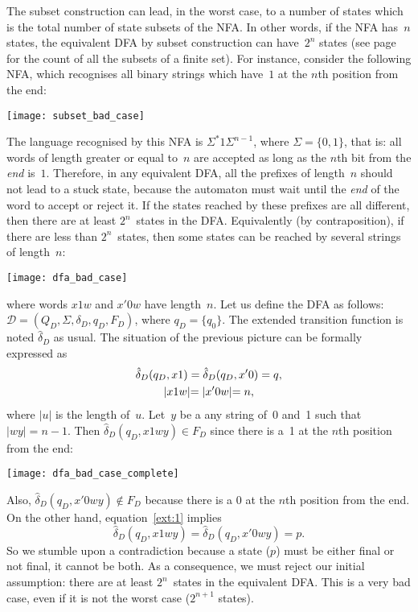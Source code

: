 The subset construction can lead, in the worst case, to a number of
states which is the total number of state subsets of the NFA. In other
words, if the NFA has~\(n\) states, the equivalent DFA by subset
construction can have~\(2^n\) states (see
page~\pageref{state_explosion} for the count of all the subsets of a
finite set). For instance, consider the following NFA, which
recognises all binary strings which have~\(1\) at the \(n\)th
position from the end:
\begin{center}
\texttt{[image: subset\_bad\_case]}
\end{center}
The language recognised by this NFA is \(\Sigma^{*} 1 \Sigma^{n-1}\),
where \(\Sigma=\{0,1\}\), that is: all words of length greater or
equal to~\(n\) are accepted as long as the \(n\)th bit from the
\emph{end} is~\(1\). Therefore, in any equivalent DFA, all the
prefixes of length~\(n\) should not lead to a stuck state, because the
automaton must wait until the \emph{end} of the word to accept or
reject it. If the states reached by these prefixes are all different,
then there are at least \(2^n\)~states in the DFA. Equivalently (by
contraposition), if there are less than \(2^n\)~states, then some
states can be reached by several strings of length~\(n\):
\begin{center}
\texttt{[image: dfa\_bad\_case]}
\end{center}
where words \(x1w\) and \(x'0w\) have length~\(n\). Let us define the
DFA as follows: \(\mathcal{D} = (Q_D, \Sigma, \delta_D, q_D, F_D)\),
where \(q_D=\{q_0\}\). The extended transition function is noted
\(\hat{\delta}_D\) as usual. The situation of the previous picture can
be formally expressed as
\begin{gather}
\hat{\delta}_D (q_D, x1) = \hat{\delta}_D (q_D, x'0) = q, \label{ext:1}\\
\lvert{x1w}\lvert = \lvert{x'0w}\lvert = n,\notag
\end{gather}
where \(\lvert{u}\lvert\) is the length of~\(u\). Let~\(y\) be a any
string of~0 and~1 such that \(\lvert{wy}\lvert = n - 1\). Then
\(\hat{\delta}_D(q_D, x1wy) \in F_D\) since there is a~1 at the
\(n\)th position from the end:
\begin{center}
\texttt{[image: dfa\_bad\_case\_complete]}
\end{center}
Also, \(\hat{\delta}_D(q_D,x'0wy) \not\in F_D\) because there is a 0
at the \(n\)th position from the end. On the other hand,
equation~\eqref{ext:1} implies
\begin{equation*}
\hat{\delta}_D (q_D, x1wy) = \hat{\delta}_D (q_D, x'0wy) = p.
\end{equation*}
So we stumble upon a contradiction because a state (\(p\)) must be
either final or not final, it cannot be both. As a consequence, we
must reject our initial assumption: there are at least \(2^n\)~states
in the equivalent DFA. This is a very bad case, even if it is not the
worst case (\(2^{n+1}\) states).
